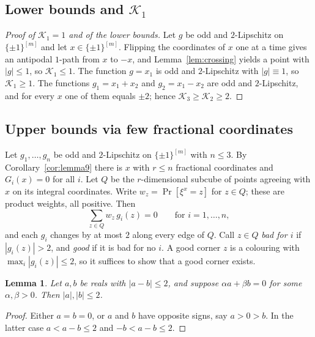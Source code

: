 \documentclass[11pt,letterpaper]{article}
\newtheorem{lemma}[theorem]{Lemma}
\theoremstyle{definition}
\newcommand{\cube}[1]{\{\pm1\}^{#1}}
\begin{document}
\subsection{Lower bounds and \texorpdfstring{$\mathcal{K}_1$}{K1}}

\begin{proof}[Proof of $\mathcal{K}_1=1$ and of the lower bounds]
Let $g$ be odd and $2$-Lipschitz on $\cube{[m]}$ and let $x\in\cube{[m]}$. Flipping the coordinates
of $x$ one at a time gives an antipodal $1$-path from $x$ to $-x$, and Lemma~\ref{lem:crossing}
yields a point with $|g|\le1$, so $\mathcal{K}_1\le1$. The function $g=x_1$ is odd and $2$-Lipschitz with
$|g|\equiv1$, so $\mathcal{K}_1\ge1$. The functions $g_1=x_1+x_2$ and $g_2=x_1-x_2$ are odd and $2$-Lipschitz,
and for every $x$ one of them equals $\pm2$; hence $\mathcal{K}_3\ge \mathcal{K}_2\ge2$.
\end{proof}

\subsection{Upper bounds via few fractional coordinates}

Let $g_1,\dots,g_n$ be odd and $2$-Lipschitz on $\cube{[m]}$ with $n\le3$. By
Corollary~\ref{cor:lemma9} there is $x$ with $r\le n$ fractional coordinates and $G_i(x)=0$ for
all $i$. Let $Q$ be the $r$-dimensional subcube of points agreeing with $x$ on its integral
coordinates. Write $w_z=\Pr[\xi^x=z]$ for $z\in Q$; these are product weights, all positive. Then
\begin{equation}\label{eq:meanzero}
  \textstyle\sum_{z\in Q}w_z\,g_i(z)=0\qquad\text{for } i=1,\dots,n,
\end{equation}
and each $g_i$ changes by at most $2$ along every edge of $Q$. Call $z\in Q$ \emph{bad for $i$} if
$|g_i(z)|>2$, and \emph{good} if it is bad for no $i$. A good corner $z$ is a colouring with
$\max_i|g_i(z)|\le2$, so it suffices to show that a good corner exists.

\begin{lemma}\label{lem:onefrac}
Let $a,b$ be reals with $|a-b|\le2$, and suppose $\alpha a+\beta b=0$ for some $\alpha,\beta>0$.
Then $|a|,|b|\le2$.
\end{lemma}

\begin{proof}
Either $a=b=0$, or $a$ and $b$ have opposite signs, say $a>0>b$. In the latter case
$a<a-b\le2$ and $-b<a-b\le2$.
\end{proof}
\end{document}
